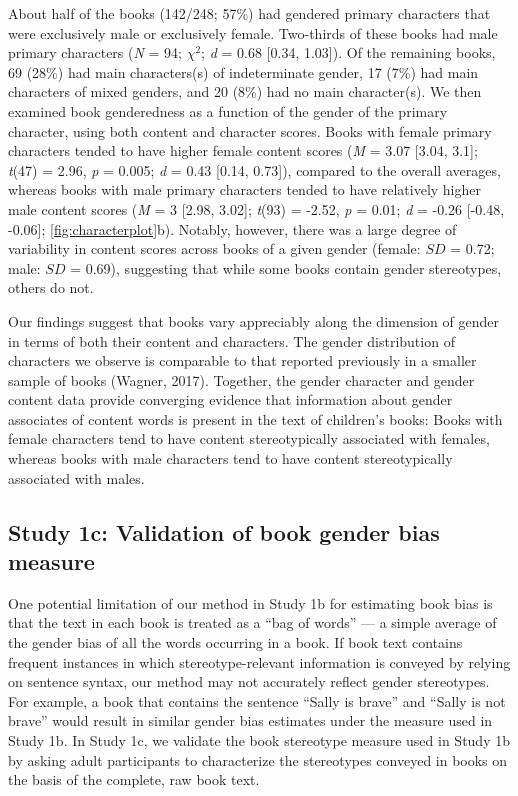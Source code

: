 \documentclass[
  english,
  ,man,floatsintext]{apa6}
\begin{document}
About half of the books (142/248; 57\%) had gendered primary characters that were exclusively male or exclusively female. Two-thirds of these books had male primary characters (\emph{N} = 94; \(\chi^2\); \emph{d} = 0.68 {[}0.34, 1.03{]}). Of the remaining books, 69 (28\%) had main characters(s) of indeterminate gender, 17 (7\%) had main characters of mixed genders, and 20 (8\%) had no main character(s). We then examined book genderedness as a function of the gender of the primary character, using both content and character scores. Books with female primary characters tended to have higher female content scores (\emph{M} = 3.07 {[}3.04, 3.1{]}; \emph{t}(47) = 2.96, \emph{p} = 0.005; \emph{d} = 0.43 {[}0.14, 0.73{]}), compared to the overall averages, whereas books with male primary characters tended to have relatively higher male content scores (\emph{M} = 3 {[}2.98, 3.02{]}; \emph{t}(93) = -2.52, \emph{p} = 0.01; \emph{d} = -0.26 {[}-0.48, -0.06{]}; \autoref{fig:characterplot}b). Notably, however, there was a large degree of variability in content scores across books of a given gender (female: \(SD\) = 0.72; male: \(SD\) = 0.69), suggesting that while some books contain gender stereotypes, others do not.

Our findings suggest that books vary appreciably along the dimension of gender in terms of both their content and characters. The gender distribution of characters we observe is comparable to that reported previously in a smaller sample of books (Wagner, 2017). Together, the gender character and gender content data provide converging evidence that information about gender associates of content words is present in the text of children's books: Books with female characters tend to have content stereotypically associated with females, whereas books with male characters tend to have content stereotypically associated with males.

\hypertarget{study-1c-validation-of-book-gender-bias-measure}{%
\subsection{Study 1c: Validation of book gender bias measure}\label{study-1c-validation-of-book-gender-bias-measure}}

One potential limitation of our method in Study 1b for estimating book bias is that the text in each book is treated as a \enquote{bag of words} --- a simple average of the gender bias of all the words occurring in a book. If book text contains frequent instances in which stereotype-relevant information is conveyed by relying on sentence syntax, our method may not accurately reflect gender stereotypes. For example, a book that contains the sentence \enquote{Sally is brave} and \enquote{Sally is not brave} would result in similar gender bias estimates under the measure used in Study 1b. In Study 1c, we validate the book stereotype measure used in Study 1b by asking adult participants to characterize the stereotypes conveyed in books on the basis of the complete, raw book text.
\end{document}
